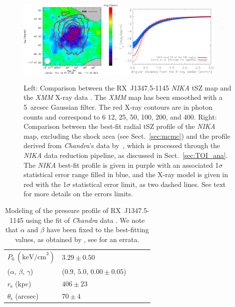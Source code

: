 	\begin{figure}
	\centering
	\includegraphics[width=0.45\textwidth]{Figure/RXJ1347-1145_NIKAvsXMM_PS_subtracted}
	\hspace*{0.5cm}
	\includegraphics[width=0.45\textwidth]{Figure/NIKA_VS_Barbara}
	\caption{Left: Comparison between the \mbox{RX~J1347.5-1145} {\it NIKA} tSZ map and the {\it XMM} \mbox{X-ray} data \citep[see the work of ][]{gitti_2004,gitti_2005,gitti_2007}. The {\it XMM} map has been smoothed with a 5~arcsec Gaussian filter. The red \mbox{X-ray} contours are in photon counts and correspond to 6 12, 25, 50, 100, 200, and 400. Right: Comparison between the best-fit radial tSZ profile of the {\it NIKA} map, excluding the shock area (see Sect.~\ref{sec:mcmc}) and the profile derived from {\it Chandra}'s data by~\cite{Barbara}, which is processed through the {\it NIKA} data reduction pipeline, as discussed in Sect.~\ref{sec:TOI_ana}. The {\it NIKA} best-fit profile is given in purple with an associated 1$\sigma$ statistical error range filled in blue, and the \mbox{X-ray} model is given in red with the 1$\sigma$ statistical error limit, as two dashed lines. See text for more details on the errors limits.}
        \label{fig:NIKAvsXray}
	\end{figure}

	\begin{table}
	\begin{center}
	\begin{tabular}{llccc}
	\hline
	\hline
	 $P_0 \ (\mathrm{keV/cm}^3)$ & $3.29 \pm 0.50$ \\
	 ($\alpha$, $\beta$, $\gamma$) & ($0.9$, $5.0$, $0.00 \pm 0.05$) \\
	 $r_{\mathrm{s}}$ (kpc) & $406 \pm 23$ \\
	 $\theta_{\mathrm{s}}$ (arcsec) &  $70 \pm 4$\\
	\hline
	\end{tabular}
	\end{center}
	\caption{Modeling of the pressure profile of \mbox{RX~J1347.5-1145} using the fit of {\it Chandra} data \citep{Barbara}. We note that $\alpha$ and $\beta$ have been fixed to the best-fitting values, as obtained by \cite{nagai_2007}, see \cite{mroczkowski_2009} for an errata.}
	\label{tab:table_clusters}
	\end{table}


